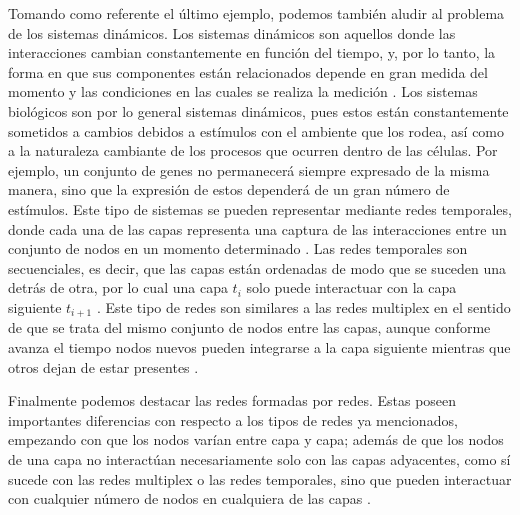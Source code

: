 \documentclass[
]{book}
\begin{document}
Tomando como referente el último ejemplo, podemos también aludir al problema de los sistemas dinámicos. Los sistemas dinámicos son aquellos donde las interacciones cambian constantemente en función del tiempo, y, por lo tanto, la forma en que sus componentes están relacionados depende en gran medida del momento y las condiciones en las cuales se realiza la medición \citep{holme2012temporal}. Los sistemas biológicos son por lo general sistemas dinámicos, pues estos están constantemente sometidos a cambios debidos a estímulos con el ambiente que los rodea, así como a la naturaleza cambiante de los procesos que ocurren dentro de las células. Por ejemplo, un conjunto de genes no permanecerá siempre expresado de la misma manera, sino que la expresión de estos dependerá de un gran número de estímulos. Este tipo de sistemas se pueden representar mediante redes temporales, donde cada una de las capas representa una captura de las interacciones entre un conjunto de nodos en un momento determinado \citep{holme2012temporal}. Las redes temporales son secuenciales, es decir, que las capas están ordenadas de modo que se suceden una detrás de otra, por lo cual una capa \(t_{i}\) solo puede interactuar con la capa siguiente \(t_{i+1}\) \citep{barrat2008dynamical}. Este tipo de redes son similares a las redes multiplex en el sentido de que se trata del mismo conjunto de nodos entre las capas, aunque conforme avanza el tiempo nodos nuevos pueden integrarse a la capa siguiente mientras que otros dejan de estar presentes \citep{barrat2008dynamical}.

Finalmente podemos destacar las redes formadas por redes. Estas poseen importantes diferencias con respecto a los tipos de redes ya mencionados, empezando con que los nodos varían entre capa y capa; además de que los nodos de una capa no interactúan necesariamente solo con las capas adyacentes, como sí sucede con las redes multiplex o las redes temporales, sino que pueden interactuar con cualquier número de nodos en cualquiera de las capas \citep{kenett2015networks}.
\end{document}

